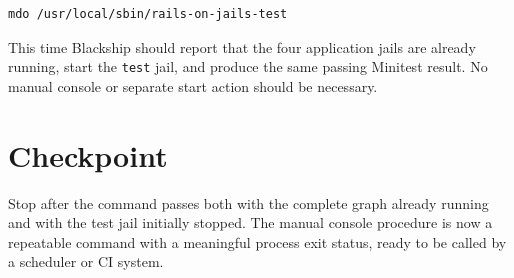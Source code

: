 \begin{lstlisting}[language=sh]
mdo /usr/local/sbin/rails-on-jails-test
\end{lstlisting}

This time Blackship should report that the four application jails are already
running, start the \texttt{test} jail, and produce the same passing Minitest
result. No manual console or separate start action should be necessary.

\section{Checkpoint}

Stop after the command passes both with the complete graph already running and
with the test jail initially stopped. The manual console procedure is now a
repeatable command with a meaningful process exit status, ready to be called
by a scheduler or CI system.
